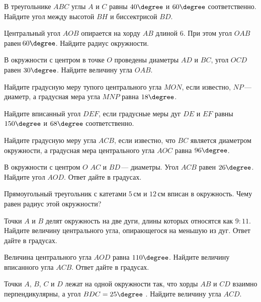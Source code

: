 \begin{class}[number=4]
\begin{listofex}
		\item В треугольнике \( ABC \) углы \( A \) и \( C \) равны \( 40\degree \) и \( 60\degree \) соответственно. Найдите угол между высотой \( BH \) и биссектрисой \( BD \).
		\item Центральный угол \( AOB \) опирается на хорду \( AB \) длиной \( 6 \). При этом угол \( OAB \) равен \( 60\degree \). Найдите радиус окружности.
		\item В окружности с центром в точке \( O \) проведены диаметры \( AD \) и \( BC \), угол \( OCD \) равен \( 30\degree \). Найдите величину угла \( OAB \).
		\item Найдите градусную меру тупого центрального угла \( MON \), если известно, \( NP \) --- диаметр, а градусная мера угла \( MNP \) равна \( 18\degree \).
		\item Найдите вписанный угол \( DEF \), если градусные меры дуг \( DE \) и \( EF \) равны \( 150\degree \) и \( 68\degree \) соответственно.
		\item Найдите градусную меру угла \( ACB \), если известно, что \( BC \) является диаметром окружности, а градусная мера центрального угла \( AOC \) равна \( 96\degree \).
		\item В окружности с центром \( O \) \( AC \) и \( BD \) --- диаметры. Угол \( ACB \) равен \( 26\degree \). Найдите угол \( AOD \). Ответ дайте в градусах.
		\item Прямоугольный треугольник с катетами \( 5 \) см и \( 12 \) см вписан в окружность. Чему равен радиус этой окружности?
		\item Точки \( A \) и \( B \) делят окружность на две дуги, длины которых относятся как \( 9:11 \). Найдите величину центрального угла, опирающегося на меньшую из дуг. Ответ дайте в градусах.
		\item Величина центрального угла \( AOD \) равна \( 110\degree \). Найдите величину вписанного угла \( ACB \). Ответ дайте в градусах.
		\item Точки \( A \), \( B \), \( C \) и \( D \) лежат на одной окружности так, что хорды \( AB \) и \( CD \) взаимно перпендикулярны, а угол \( BDC=25\degree \) . Найдите величину угла \( ACD \).
	\end{listofex}
\end{class}

